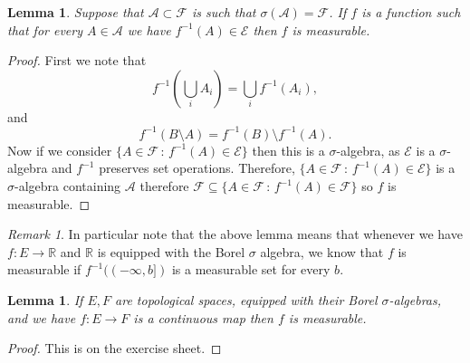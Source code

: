 \documentclass[11pt]{article}
\newtheorem{lem}[thm]{Lemma}
\theoremstyle{definition}
\theoremstyle{remark}
\newtheorem{remark}[thm]{Remark}
\begin{document}
\begin{lem} Suppose that $\mathcal{A} \subset \mathcal{F}$ is such that $\sigma(\mathcal{A})= \mathcal{F}$. If $f$ is a function such that for every $A \in \mathcal{A}$ we have $f^{-1}(A) \in \mathcal{E}$ then $f$ is measurable. 
\end{lem}
\begin{proof}
First we note that
\[ f^{-1}\left( \bigcup_i A_i \right) = \bigcup_i f^{-1}(A_i), \] and
\[ f^{-1}(B \setminus A) = f^{-1}(B) \setminus f^{-1}(A). \] Now if we consider $\{ A \in \mathcal{F} \, :\, f^{-1}(A) \in \mathcal{E}\}$ then this is a $\sigma$-algebra, as $\mathcal{E}$ is a $\sigma$-algebra and $f^{-1}$ preserves set operations. Therefore, $\{ A \in \mathcal{F} \, :\, f^{-1}(A) \in \mathcal{E}\}$ is a $\sigma$-algebra containing $\mathcal{A}$ therefore $\mathcal{F} \subseteq  \{ A \in \mathcal{F} \, :\, f^{-1}(A) \in \mathcal{F}\}$ so $f$ is measurable.
\end{proof}

\begin{remark}
In particular note that the above lemma means that whenever we have $f: E \rightarrow \mathbb{R}$ and $\mathbb{R}$ is equipped with the Borel $\sigma$ algebra, we know that $f$ is measurable if $f^{-1}((-\infty, b])$ is a measurable set for every $b$.
\end{remark}

\begin{lem}
If $E, F$ are topological spaces, equipped with their Borel $\sigma$-algebras, and we have $f:E \rightarrow F$ is a continuous map then $f$ is measurable.
\end{lem}
\begin{proof}
This is on the exercise sheet.
\end{proof}
\end{document}
